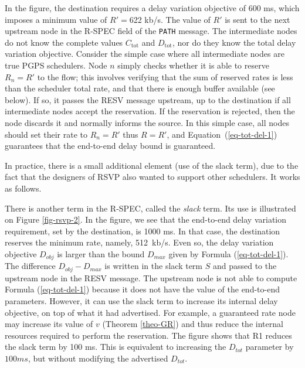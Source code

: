 In the figure, the destination requires a delay variation
objective of 600 ms, which imposes a minimum value of $R'=$622
kb/s.  The value of $R'$ is sent to the next upstream node in the
R-SPEC field of the \texttt{PATH} message.  The intermediate nodes
do not know the complete values $C_{\mbox{tot}}$ and
$D_{\mbox{tot}}$, nor do they know the total delay variation
objective. Consider the simple case where all intermediate nodes
are true PGPS schedulers. Node $n$ simply checks whether it is
able to reserve $R_n=R'$ to the flow; this involves verifying that
the sum of reserved rates is less than the scheduler total rate,
and that there is enough buffer available (see below). If so, it
passes the RESV message upstream, up to the destination if all
intermediate nodes accept the reservation. If the reservation is
rejected, then the node discards it and normally informs the
source. In this simple case, all nodes should set their rate to
$R_n=R'$ thus $R=R'$, and Equation~(\ref{eq-tot-del-1}) guarantees
that the end-to-end delay bound is guaranteed.

In practice, there is a small additional element (use of the slack
term), due to the fact that the designers of RSVP also wanted to
support other schedulers. It works as follows.

\begin{figure}[!htbp]
\end{figure}

There is another term in the R-SPEC, called the \emph{slack} term.
Its use is illustrated on Figure \ref{fig-rsvp-2}. In the figure,
we see that the end-to-end delay variation requirement, set by the
destination, is 1000 ms. In that case, the destination reserves
the minimum rate, namely, 512~kb/s. Even so, the delay variation
objective $D_{obj}$ is larger than the bound $D_{max}$ given by
Formula (\ref{eq-tot-del-1}). The difference $  D_{obj} - D_{max}$
is written in the slack term $S$ and passed to the upstream node
in the RESV message. The upstream node is not able to compute
Formula (\ref{eq-tot-del-1}) because it does not have the value of
the end-to-end parameters. However, it can use the slack term to
increase its internal delay objective, on top of what it had
advertised. For example, a guaranteed rate node may increase its
value of $v$ (Theorem \ref{theo-GR}) and thus reduce the internal
resources required to perform the reservation. The figure shows
that R1 reduces the slack term by 100 ms. This is equivalent to
increasing the $D_{tot}$ parameter by $100ms$, but without
modifying the advertised $D_{tot}$.

